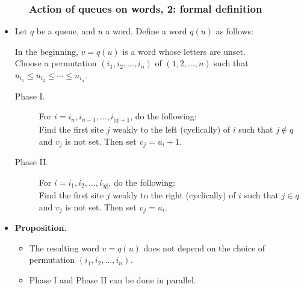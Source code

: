 \documentclass{beamer}
\newcommand{\fti}[1]{\frametitle{\ \ \ \ \ #1}}
\newcommand{\abs}[1]{\left| #1 \right|}
\newcommand{\tup}[1]{\left( #1 \right)}
\theoremstyle{plain}
\newcommand{\0}{\phantom{c}}
\begin{document}
\begin{frame}
\fti{Action of queues on words, 2: formal definition}
\begin{itemize}

\item Let $q$ be a queue, and $u$ a word. Define a word $q(u)$ as follows:

In the beginning, $v = q(u)$ is a word whose letters are unset. \\
Choose a permutation $\tup{i_1, i_2, \ldots, i_n}$ of $\tup{1, 2, \ldots, n}$
such that $u_{i_1} \leq u_{i_2} \leq \cdots \leq u_{i_n}$.

\begin{description}
\item[Phase I.]
  For $i = i_n, i_{n-1}, \ldots, i_{\abs{q}+1}$, do the following: \\
    Find the first site $j$ weakly to the left (cyclically) of $i$ such that $j \notin q$ and $v_j$ is not set.
    Then set $v_j = u_i + 1$.

\item[Phase II.]
  For $i = i_1, i_2, \ldots, i_{\abs{q}}$, do the following: \\
    Find the first site $j$ weakly to the right (cyclically) of $i$ such that $j \in q$ and $v_j$ is not set.
    Then set $v_j = u_i$.
\end{description}
\pause

\item \textbf{Proposition.}
\begin{itemize}
\item The resulting word $v = q(u)$ does not depend on the choice of permutation $(i_1, i_2, \dotsc, i_n)$.
\item Phase I and Phase II can be done in parallel. %
\end{itemize}

\end{itemize}
\vspace{10cm}
\end{frame}
\end{document}
